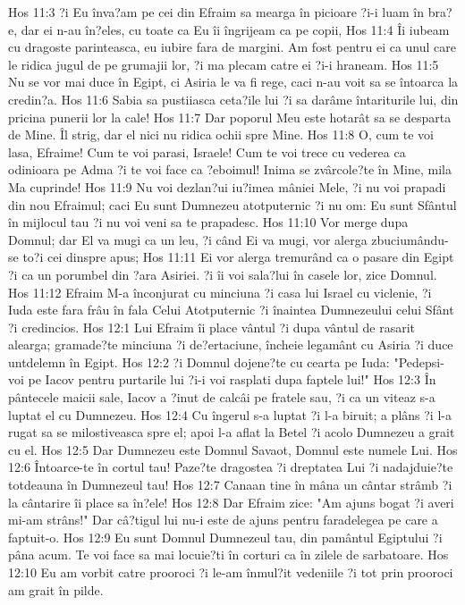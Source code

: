 Hos 11:3  ?i Eu înva?am pe cei din Efraim sa mearga în picioare ?i-i luam în bra?e, dar ei n-au în?eles, cu toate ca Eu îi îngrijeam ca pe copii,
Hos 11:4  Îi iubeam cu dragoste parinteasca, eu iubire fara de margini. Am fost pentru ei ca unul care le ridica jugul de pe grumajii lor, ?i ma plecam catre ei ?i-i hraneam.
Hos 11:5  Nu se vor mai duce în Egipt, ci Asiria le va fi rege, caci n-au voit sa se întoarca la credin?a.
Hos 11:6  Sabia sa pustiiasca ceta?ile lui ?i sa darâme întariturile lui, din pricina punerii lor la cale!
Hos 11:7  Dar poporul Meu este hotarât sa se desparta de Mine. Îl strig, dar el nici nu ridica ochii spre Mine.
Hos 11:8  O, cum te voi lasa, Efraime! Cum te voi parasi, Israele! Cum te voi trece cu vederea ca odinioara pe Adma ?i te voi face ca ?eboimul! Inima se zvârcole?te în Mine, mila Ma cuprinde!
Hos 11:9  Nu voi dezlan?ui iu?imea mâniei Mele, ?i nu voi prapadi din nou Efraimul; caci Eu sunt Dumnezeu atotputernic ?i nu om: Eu sunt Sfântul în mijlocul tau ?i nu voi veni sa te prapadesc.
Hos 11:10  Vor merge dupa Domnul; dar El va mugi ca un leu, ?i când Ei va mugi, vor alerga zbuciumându-se to?i cei dinspre apus;
Hos 11:11  Ei vor alerga tremurând ca o pasare din Egipt ?i ca un porumbel din ?ara Asiriei. ?i îi voi sala?lui în casele lor, zice Domnul.
Hos 11:12  Efraim M-a înconjurat cu minciuna ?i casa lui Israel cu viclenie, ?i Iuda este fara frâu în fala Celui Atotputernic ?i înaintea Dumnezeului celui Sfânt ?i credincios.
Hos 12:1  Lui Efraim îi place vântul ?i dupa vântul de rasarit alearga; gramade?te minciuna ?i de?ertaciune, încheie legamânt cu Asiria ?i duce untdelemn în Egipt.
Hos 12:2  ?i Domnul dojene?te cu cearta pe Iuda: "Pedepsi-voi pe Iacov pentru purtarile lui ?i-i voi rasplati dupa faptele lui!"
Hos 12:3  În pântecele maicii sale, Iacov a ?inut de calcâi pe fratele sau, ?i ca un viteaz s-a luptat el cu Dumnezeu.
Hos 12:4  Cu îngerul s-a luptat ?i l-a biruit; a plâns ?i l-a rugat sa se milostiveasca spre el; apoi l-a aflat la Betel ?i acolo Dumnezeu a grait cu el.
Hos 12:5  Dar Dumnezeu este Domnul Savaot, Domnul este numele Lui.
Hos 12:6  Întoarce-te în cortul tau! Paze?te dragostea ?i dreptatea Lui ?i nadajduie?te totdeauna în Dumnezeul tau!
Hos 12:7  Canaan tine în mâna un cântar strâmb ?i la cântarire îi place sa în?ele!
Hos 12:8  Dar Efraim zice: "Am ajuns bogat ?i averi mi-am strâns!" Dar câ?tigul lui nu-i este de ajuns pentru faradelegea pe care a faptuit-o.
Hos 12:9  Eu sunt Domnul Dumnezeul tau, din pamântul Egiptului ?i pâna acum. Te voi face sa mai locuie?ti în corturi ca în zilele de sarbatoare.
Hos 12:10  Eu am vorbit catre prooroci ?i le-am înmul?it vedeniile ?i tot prin prooroci am grait în pilde.
